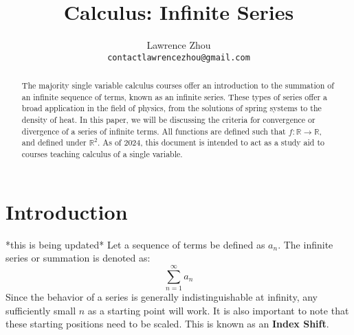 \documentclass[a4paper, 11pt]{article}
\title{\textbf{Calculus: Infinite Series}}
\author{Lawrence Zhou \\ \texttt{contactlawrencezhou@gmail.com}}
\date{}
\begin{document}
\maketitle
\begin{abstract}
    The majority single variable calculus courses offer an introduction to the summation of an infinite sequence of terms, known as an infinite series. These types of series offer a broad application in the field of physics, from the solutions of spring systems to the density of heat. In this paper, we will be discussing the criteria for convergence or divergence of a series of infinite terms. All functions are defined such that $f: \mathbb{R} \rightarrow \mathbb{R}$, and defined under $\mathbb{R} ^ 2$. As of 2024, this document is intended to act as a study aid to courses teaching calculus of a single variable.
\end{abstract}

\section{Introduction}
*this is being updated*
Let a sequence of terms be defined as \(a_n\). 
The infinite series or summation is denoted as: 
\[
\sum_{n=1}^{\infty}  a_n
\]
Since the behavior of a series is generally indistinguishable at infinity, any sufficiently small \(n\) as a starting point will work. It is also important to note that these starting positions need to be scaled. This is known as an \textbf{Index Shift}.
\end{document}
